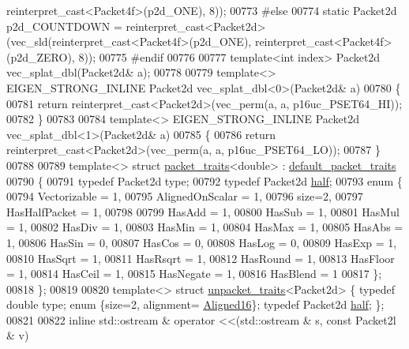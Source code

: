 \begin{DoxyCode}
{      reinterpret\_cast<Packet4f>(p2d\_ONE), 8));
00773 \textcolor{preprocessor}{#else}
00774 \textcolor{keyword}{static} Packet2d p2d\_COUNTDOWN = \textcolor{keyword}{reinterpret\_cast<}Packet2d\textcolor{keyword}{>}(vec\_sld(reinterpret\_cast<Packet4f>(p2d\_ONE), 
      reinterpret\_cast<Packet4f>(p2d\_ZERO), 8));
00775 \textcolor{preprocessor}{#endif}
00776 
00777 \textcolor{keyword}{template}<\textcolor{keywordtype}{int} index> Packet2d vec\_splat\_dbl(Packet2d& a);
00778 
00779 \textcolor{keyword}{template}<> EIGEN\_STRONG\_INLINE Packet2d vec\_splat\_dbl<0>(Packet2d& a)
00780 \{
00781   \textcolor{keywordflow}{return} \textcolor{keyword}{reinterpret\_cast<}Packet2d\textcolor{keyword}{>}(vec\_perm(a, a, p16uc\_PSET64\_HI));
00782 \}
00783 
00784 \textcolor{keyword}{template}<> EIGEN\_STRONG\_INLINE Packet2d vec\_splat\_dbl<1>(Packet2d& a)
00785 \{
00786   \textcolor{keywordflow}{return} \textcolor{keyword}{reinterpret\_cast<}Packet2d\textcolor{keyword}{>}(vec\_perm(a, a, p16uc\_PSET64\_LO));
00787 \}
00788 
00789 \textcolor{keyword}{template}<> \textcolor{keyword}{struct }\hyperlink{struct_eigen_1_1internal_1_1packet__traits}{packet\_traits}<double> : \hyperlink{struct_eigen_1_1internal_1_1default__packet__traits}{default\_packet\_traits}
00790 \{
00791   \textcolor{keyword}{typedef} Packet2d type;
00792   \textcolor{keyword}{typedef} Packet2d \hyperlink{struct_eigen_1_1half}{half};
00793   \textcolor{keyword}{enum} \{
00794     Vectorizable = 1,
00795     AlignedOnScalar = 1,
00796     size=2,
00797     HasHalfPacket = 1,
00798 
00799     HasAdd  = 1,
00800     HasSub  = 1,
00801     HasMul  = 1,
00802     HasDiv  = 1,
00803     HasMin  = 1,
00804     HasMax  = 1,
00805     HasAbs  = 1,
00806     HasSin  = 0,
00807     HasCos  = 0,
00808     HasLog  = 0,
00809     HasExp  = 1,
00810     HasSqrt = 1,
00811     HasRsqrt = 1,
00812     HasRound = 1,
00813     HasFloor = 1,
00814     HasCeil = 1,
00815     HasNegate = 1,
00816     HasBlend = 1
00817   \};
00818 \};
00819 
00820 \textcolor{keyword}{template}<> \textcolor{keyword}{struct }\hyperlink{struct_eigen_1_1internal_1_1unpacket__traits}{unpacket\_traits}<Packet2d> \{ \textcolor{keyword}{typedef} \textcolor{keywordtype}{double} type; \textcolor{keyword}{enum} \{size=2, alignment=
      \hyperlink{group__enums_gga45fe06e29902b7a2773de05ba27b47a1af8e2bf74b04c02199f62c5e3c06dbfcc}{Aligned16}\}; \textcolor{keyword}{typedef} Packet2d \hyperlink{struct_eigen_1_1half}{half}; \};
00821 
00822 \textcolor{keyword}{inline} std::ostream & operator <<(std::ostream & s, \textcolor{keyword}{const} Packet2l & v)
}
\end{DoxyCode}
